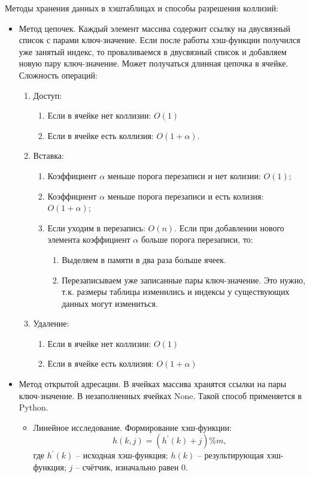 \documentclass{article}
\begin{document}
Методы хранения данных в хэштаблицах и способы разрешения коллизий:
\begin{itemize}
    \item Метод цепочек. Каждый элемент массива содержит ссылку на двусвязный список с парами ключ-значение. Если после работы хэш-функции получился уже занятый индекс, то
    проваливаемся в двусвязный список и добавляем новую пару ключ-значение. Может получаться длинная цепочка в ячейке.
    Сложность операций:
    \begin{enumerate}
        \item Доступ:
        \begin{enumerate}
            \item Если в ячейке нет коллизии: $O(1)$
            \item Если в ячейке есть коллизия: $O(1 + \alpha)$.
        \end{enumerate}
        \item Вставка:
        \begin{enumerate}
            \item Коэффициент $\alpha$ меньше порога перезаписи и нет колизии: $O(1)$;
            \item Коэффициент $\alpha$ меньше порога перезаписи и есть колизия: $O(1 + \alpha)$;
            \item Если уходим в перезапись: $O(n)$. Если при добавлении нового элемента коэффициент $\alpha$ больше порога перезаписи, то:
            \begin{enumerate}
                \item Выделяем в памяти в два раза больше ячеек.
                \item Перезаписываем уже записанные пары ключ-значение. Это нужно, т.к. размеры таблицы изменились и индексы у существующих данных могут измениться.
            \end{enumerate} 
        \end{enumerate}
        \item Удаление:
        \begin{enumerate}
            \item Если в ячейке нет коллизии: $O(1)$
            \item Если в ячейке есть коллизия: $O(1 + \alpha)$
        \end{enumerate}
    \end{enumerate}
    \item Метод открытой адресации. В ячейках массива хранятся ссылки на пары ключ-значение. В незаполненных ячейках None. Такой способ применяется в Python.
    \begin{itemize}
        \item Линейное исследование. Формирование хэш-функции:
        \begin{equation}\label{eq:hash_linear}
            h(k, j) = (h^{'}(k) + j) \% m,
        \end{equation}где $h^{'}(k)$ -- исходная хэш-функция; $h(k)$ -- результирующая хэш-функция; $j$ -- счётчик, изначально равен 0.


\end{itemize}
\end{itemize}
\end{document}

